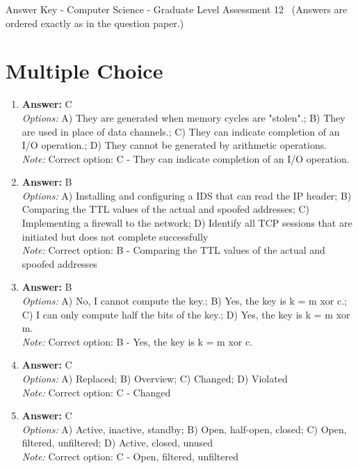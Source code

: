 \documentclass[12pt]{article}
\begin{document}
\begin{center}
Answer Key - Computer Science - Graduate Level Assessment 12 \
\small (Answers are ordered exactly as in the question paper.)
\end{center}

\section*{Multiple Choice}
\begin{enumerate}[label=\arabic*.]
\item \textbf{Answer:} C
\\ \textit{Options:} A) They are generated when memory cycles are "stolen".; B) They are used in place of data channels.; C) They can indicate completion of an I/O operation.; D) They cannot be generated by arithmetic operations.
\\ \textit{Note:} Correct option: C - They can indicate completion of an I/O operation.
\item \textbf{Answer:} B
\\ \textit{Options:} A) Installing and configuring a IDS that can read the IP header; B) Comparing the TTL values of the actual and spoofed addresses; C) Implementing a firewall to the network; D) Identify all TCP sessions that are initiated but does not complete successfully
\\ \textit{Note:} Correct option: B - Comparing the TTL values of the actual and spoofed addresses
\item \textbf{Answer:} B
\\ \textit{Options:} A) No, I cannot compute the key.; B) Yes, the key is k = m xor c.; C) I can only compute half the bits of the key.; D) Yes, the key is k = m xor m.
\\ \textit{Note:} Correct option: B - Yes, the key is k = m xor c.
\item \textbf{Answer:} C
\\ \textit{Options:} A) Replaced; B) Overview; C) Changed; D) Violated
\\ \textit{Note:} Correct option: C - Changed
\item \textbf{Answer:} C
\\ \textit{Options:} A) Active, inactive, standby; B) Open, half-open, closed; C) Open, filtered, unfiltered; D) Active, closed, unused
\\ \textit{Note:} Correct option: C - Open, filtered, unfiltered
\end{enumerate}
\end{document}
